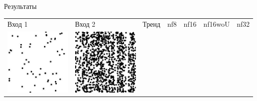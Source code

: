 \documentclass[12pt]{beamer}
\begin{document}
	\begin{frame}{Результаты}
		\begin{table}
			\begin{center}
				\begin{tabular}{p{1.2cm} p{1.2cm} p{1.2cm} p{1.2cm} p{1.2cm} p{1.2cm} p{1.2cm}}
					\toprule
					Вход 1 & Вход 2 & Тренд & nf8 & nf16 & nf16woU & nf32 \\
					\cmidrule(r){1-1}\cmidrule(lr){2-2}\cmidrule(lr){3-3}\cmidrule(lr){4-4}\cmidrule(lr){5-5}\cmidrule(lr){6-6}\cmidrule(l){7-7}
					\includegraphics[width=1\linewidth]{8-results/sand-trend2/left1}
					&
					\includegraphics[width=1\linewidth]{8-results/sand-trend2/right1}

\end{tabular}
\end{center}
\end{table}
\end{frame}
\end{document}
